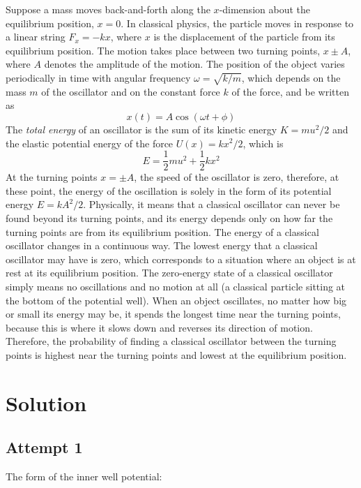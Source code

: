 Suppose a mass moves back-and-forth along the $x$-dimension about the equilibrium position, $x=0$. In classical physics, the particle moves in response to a linear string $F_{x}=-kx$, where $x$ is the displacement of the particle from its equilibrium position. The motion takes place between two turning points, $x\pm A$, where $A$ denotes the amplitude of the motion. The position of the object varies periodically in time with angular frequency $\omega=\sqrt{k/m}$, which depends on the mass $m$ of the oscillator and on the constant force $k$ of the force, and be written as
\begin{equation}
  x(t) = A\cos{(\omega t+\phi)}
\end{equation}
The \textit{total energy} of an oscillator is the sum of its kinetic energy $K=mu^{2}/2$ and the elastic potential energy of the force $U(x)=kx^{2}/2$, which is 
\begin{equation}
  E = \frac{1}{2} mu^{2} + \frac{1}{2} kx^{2}
\end{equation}
At the turning points $x=\pm A$, the speed of the oscillator is zero, therefore, at these point, the energy of the oscillation is solely in the form of its potential energy $E=kA^{2}/2$. Physically, it means that a classical oscillator can never be found beyond its turning points, and its energy depends only on how far the turning points are from its equilibrium position. The energy of a classical oscillator changes in a continuous way. The lowest energy that a classical oscillator may have is zero, which corresponds to a situation where an object is at rest at its equilibrium position. The zero-energy state of a classical oscillator simply means no oscillations and no motion at all (a classical particle sitting at the bottom of the potential well). When an object oscillates, no matter how big or small its energy may be, it spends the longest time near the turning points, because this is where it slows down and reverses its direction of motion. Therefore, the probability of finding a classical oscillator between the turning points is highest near the turning points and lowest at the equilibrium position.

\section{Solution}
\subsection{Attempt 1}
The form of the inner well potential: 


